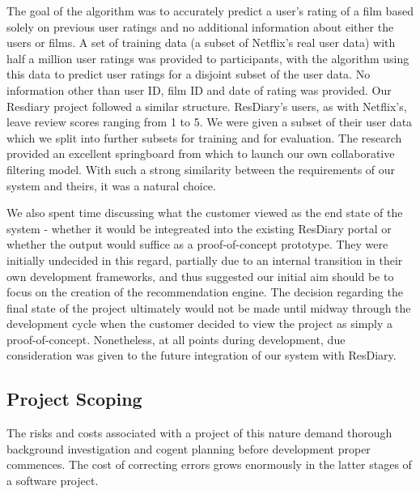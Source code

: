 \documentclass{l3proj}
\begin{document}
The goal of the algorithm was to accurately predict a user's rating of a film based solely on previous user ratings and no additional information about either the users or films. A set of training data (a subset of Netflix's real user data) with half a million user ratings was provided to participants, with the algorithm using this data to predict user ratings for a disjoint subset of the user data. No information other than user ID, film ID and date of rating was provided. Our Resdiary project followed a similar structure. ResDiary's users, as with Netflix's, leave review scores ranging from 1 to 5. We were given a subset of their user data which we split into further subsets for training and for evaluation. The research provided an excellent springboard from which to launch our own collaborative filtering model. With such a strong similarity between the requirements of our system and theirs, it was a natural choice.

We also spent time discussing what the customer viewed as the end state of the system - whether it would be integreated into the existing ResDiary portal or whether the output would suffice as a proof-of-concept prototype. They were initially undecided in this regard, partially due to an internal transition in their own development frameworks, and thus suggested our initial aim should be to focus on the creation of the recommendation engine. The decision regarding the final state of the project ultimately would not be made until midway through the development cycle when the customer decided to view the project as simply a proof-of-concept. Nonetheless, at all points during development, due consideration was given to the future integration of our system with ResDiary. 


\subsection{Project Scoping}
\label{sec:ourinitobjectives}
The risks and costs associated with a project of this nature demand thorough background investigation and cogent planning before development proper commences. The cost of correcting errors grows enormously in the latter stages of a software project.
\end{document}
